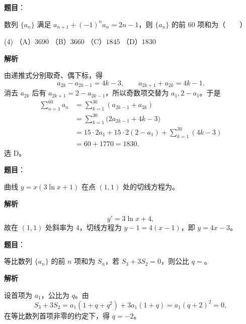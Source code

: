 \begin{answer}

\textbf{题目}：

数列 $\{a_n\}$ 满足 $a_{n+1}+(-1)^n a_n=2n-1$，则 $\{a_n\}$ 的前 $60$ 项和为\mbox{（　　）}

\begin{gkopts}(4)
\task （A）$3690$
\task （B）$3660$
\task （C）$1845$
\task （D）$1830$
\end{gkopts}

\textbf{解析}

由递推式分别取奇、偶下标，得
\nopagebreak[4]
\[
a_{2k}-a_{2k-1}=4k-3,\qquad a_{2k+1}+a_{2k}=4k-1.
\]
消去 $a_{2k}$ 后有 $a_{2k+1}=2-a_{2k-1}$，所以奇数项交替为 $a_1,2-a_1$。于是
\nopagebreak[4]
\[
\begin{aligned}
\sum_{n=1}^{60}a_n
&=\sum_{k=1}^{30}(a_{2k-1}+a_{2k})\\
&=\sum_{k=1}^{30}\bigl(2a_{2k-1}+4k-3\bigr)\\
&=15\cdot2a_1+15\cdot2(2-a_1)+\sum_{k=1}^{30}(4k-3)\\
&=60+1770=1830.
\end{aligned}
\]
选 D。


\end{answer}
\begin{answer}

\textbf{题目}：

曲线 $y=x(3\ln x+1)$ 在点 $(1,1)$ 处的切线方程为\gkblank{}。

\textbf{解析}

\nopagebreak[4]
\[
y'=3\ln x+4,
\]
故在 $(1,1)$ 处斜率为 $4$，切线方程为 $y-1=4(x-1)$，即 $y=4x-3$。


\end{answer}
\begin{answer}

\textbf{题目}：

等比数列 $\{a_n\}$ 的前 $n$ 项和为 $S_n$，若 $S_3+3S_2=0$，则公比 $q=$\gkblank{}。

\textbf{解析}

设首项为 $a_1$，公比为 $q$。由
\nopagebreak[4]
\[
S_3+3S_2=a_1(1+q+q^2)+3a_1(1+q)=a_1(q+2)^2=0,
\]
在等比数列首项非零的约定下，得 $q=-2$。


\end{answer}
